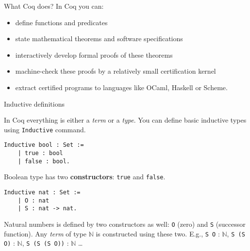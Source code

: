 \documentclass[10pt]{beamer}
\begin{document}
\begin{frame}{What Coq does?}
  In Coq you can:
  \begin{itemize}
  
    \item define functions and predicates
   \item state mathematical theorems and software specifications
    \item interactively develop formal proofs of these theorems
   \item machine-check these proofs by a relatively small certification kernel
    \item extract certified programs to languages like OCaml, Haskell or Scheme.
  \end{itemize}
  

\end{frame}


\begin{frame}[fragile]{Inductive definitions}

  In Coq everything is either a {\it term} or a {\it type}. You can define basic inductive types using \texttt{Inductive} command.

  \begin{lstlisting}[language=Coq]
  Inductive bool : Set :=
    | true : bool
    | false : bool.

  \end{lstlisting}

  Boolean type has two {\bf constructors}: \texttt{true} and \texttt{false}.  
  
   \begin{lstlisting}[language=Coq]
  Inductive nat : Set :=
    | O : nat
    | S : nat -> nat.  
   \end{lstlisting}

   Natural numbers is defined by two constructors as well: \texttt{O} (zero) and \texttt{S} (successor function). Any {\it term} of type $\mathbb{N}$ is constructed using these two. E.g., \texttt{S O} : $\mathbb{N}$, \texttt{S (S O)} : $\mathbb{N}$, \texttt{S (S (S O))} : $\mathbb{N}$  \ldots
\end{frame}
\end{document}
